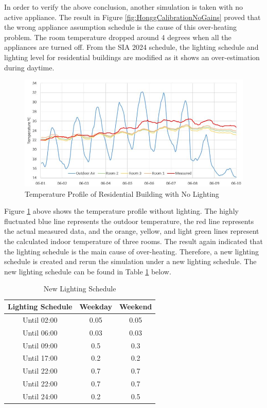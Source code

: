 \documentclass[a4paper, oneside]{discothesis}
\begin{document}
			In order to verify the above conclusion, another simulation is taken with no active appliance. The result in Figure \ref{fig:HonggCalibrationNoGains} proved that the wrong appliance assumption schedule is the cause of this over-heating problem. The room temperature dropped around 4 degrees when all the appliances are turned off. From the SIA 2024 schedule, the lighting schedule and lighting level for residential buildings are modified as it shows an over-estimation during daytime. \\

			\begin{figure}[H]
			\centering
			\includegraphics[scale=0.6]{Hongg_Clibration_03NoLight.JPG}
			\caption{Temperature Profile of Residential Building with No Lighting}
			\label{fig:HonggerCalibrationNoLight}
			\end{figure}

			Figure \ref{fig:HonggerCalibrationNoLight} above shows the temperature profile without lighting. The highly fluctuated blue line represents the outdoor temperature, the red line represents the actual measured data, and the orange, yellow, and light green lines represent  the calculated indoor temperature of three rooms. The result again indicated that the lighting schedule is the main cause of over-heating. Therefore, a new lighting schedule is created and rerun the simulation under a new lighting schedule. The new lighting schedule can be found in Table \ref{tab:HonggLightingCtrl} below.
			
        	\begin{table}[htbp]
        	\centering
        	\caption{New Lighting Schedule}
        	    \begin{tabular}{ccc}
        	    \toprule
        	    Lighting Schedule & Weekday & Weekend\\
        	    \midrule
                Until 02:00 & 0.05 & 0.05 \\
                Until 06:00 & 0.03 & 0.03\\
                Until 09:00 & 0.5 & 0.3\\
                Until 17:00 & 0.2 & 0.2\\
                Until 22:00 & 0.7 & 0.7\\
                Until 22:00 & 0.7 & 0.7\\
                Until 24:00 & 0.2 & 0.5\\
        	    \bottomrule
        	    \end{tabular}%
        	  \label{tab:HonggLightingCtrl}%
        	\end{table}%
			
\end{document}
